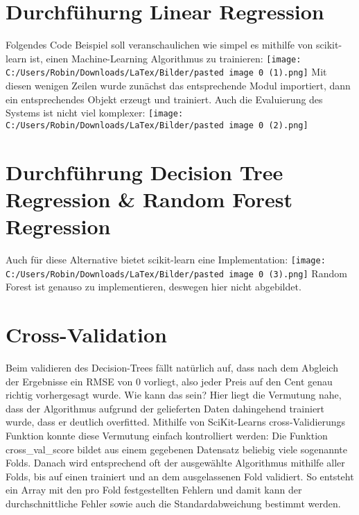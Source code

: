 \section{Durchfühurng Linear Regression}
\label{durchfühurngLinearRegression}
Folgendes Code Beispiel soll veranschaulichen wie simpel es mithilfe von scikit-learn ist, einen Machine-Learning Algorithmus zu trainieren:
\newline
\texttt{[image: C:/Users/Robin/Downloads/LaTex/Bilder/pasted image 0 (1).png]}
\newline
Mit diesen wenigen Zeilen wurde zunächst das entsprechende Modul importiert, dann ein entsprechendes Objekt erzeugt und trainiert. 
Auch die Evaluierung des Systems ist nicht viel komplexer:
\newline
\texttt{[image: C:/Users/Robin/Downloads/LaTex/Bilder/pasted image 0 (2).png]}


\section{Durchführung Decision Tree Regression \& Random Forest Regression}
\label{durchführungDecisionTreeRegressionRandomForestRegression}
Auch für diese Alternative bietet scikit-learn eine Implementation:
\newline
\texttt{[image: C:/Users/Robin/Downloads/LaTex/Bilder/pasted image 0 (3).png]}
\newline
Random Forest ist genauso zu implementieren, deswegen hier nicht abgebildet.

\section{Cross-Validation}
\label{crossValidation}
Beim validieren des Decision-Trees fällt natürlich auf, dass nach dem Abgleich der Ergebnisse ein RMSE von 0 vorliegt, also jeder Preis auf den Cent genau richtig vorhergesagt wurde. Wie kann das sein? 
Hier liegt die Vermutung nahe, dass der Algorithmus aufgrund der gelieferten Daten dahingehend trainiert wurde, dass er deutlich overfitted.
Mithilfe von SciKit-Learns cross-Validierungs Funktion konnte diese Vermutung einfach kontrolliert werden: Die Funktion cross\_val\_score bildet aus einem gegebenen Datensatz beliebig viele sogenannte Folds. Danach wird entsprechend oft der ausgewählte Algorithmus mithilfe aller Folds, bis auf einen trainiert und an dem ausgelassenen Fold validiert. So entsteht ein Array mit den pro Fold festgestellten Fehlern und damit kann der durchschnittliche Fehler sowie auch die Standardabweichung bestimmt werden.


